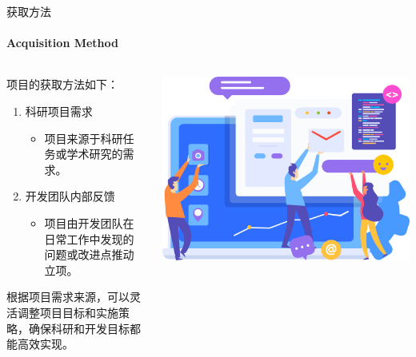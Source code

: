 \documentclass{beamer}
\begin{document}
\begin{frame}[fragile]{获取方法}
\framesubtitle{Acquisition Method}
\begin{columns}
\begin{column}{0.45\textwidth}
项目的获取方法如下：
\begin{enumerate}
\item 科研项目需求
\begin{itemize}
\item 项目来源于科研任务或学术研究的需求。
\end{itemize}
\item 开发团队内部反馈
\begin{itemize}
\item 项目由开发团队在日常工作中发现的问题或改进点推动立项。
\end{itemize}
\end{enumerate}
根据项目需求来源，可以灵活调整项目目标和实施策略，确保科研和开发目标都能高效实现。
\end{column}
\begin{column}{0.45\textwidth}
\includegraphics[width=\textwidth]
{figures/acquisition_method}
\end{column}
\end{columns}
\end{frame}


\backmatter
\end{document}
